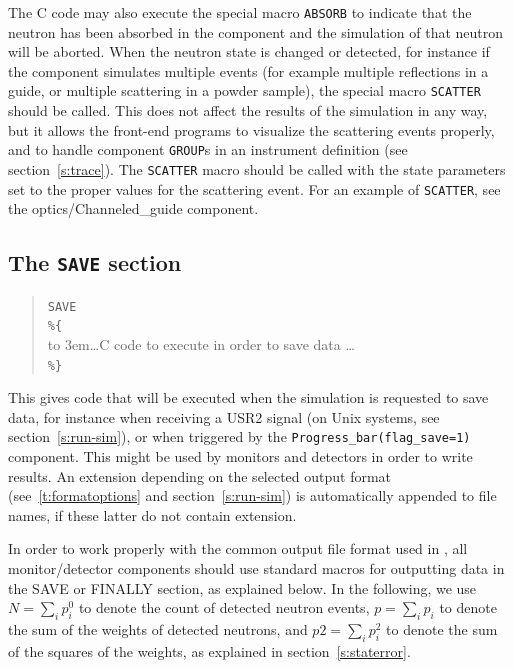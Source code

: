The C code may also execute the special macro \texttt{ABSORB} to indicate
that the neutron has been absorbed in the component and the simulation of
that neutron will be aborted. When the neutron state is changed or detected, for
instance if the component simulates multiple events (for example multiple
reflections in a guide, or multiple scattering in a powder sample), the
special macro \texttt{SCATTER} should be called. This does not affect the
results of the simulation in any way, but it allows the front-end
programs to visualize the scattering events properly, and to handle
component \texttt{GROUP}s in an instrument definition (see
section~\ref{s:trace}). The \texttt{SCATTER} macro should be called with
the state parameters set to the proper values for the scattering event.
For an example of \texttt{SCATTER}, see the optics/Channeled\_guide
component. 


\subsection{The \texttt{SAVE} section}
\label{s:comp-save}

\begin{quote}
  \texttt{SAVE} \\
  \verb|%{| \\
  \hbox to 3em{}\ldots C code to execute in order to save data \ldots \\
  \verb|%}|
\end{quote}
This gives code that will be executed when the simulation is requested to save data, for instance when receiving a USR2 signal (on Unix systems, see section~\ref{s:run-sim}), or when triggered by the \texttt{Progress\_bar(flag\_save=1)} component.
This might be used by monitors and detectors in order to write results.
An extension depending on the selected output format (see~\ref{t:formatoptions} and section~\ref{s:run-sim}) is automatically appended to file names, if these latter do not contain extension.

In order to work properly with the common output file format used in
\MCS, all monitor/detector components should use standard macros for
outputting data in the SAVE or FINALLY section, as explained below. In the
following, we use $N = \sum_i p_i^0$ to denote the count of detected
neutron events, $p = \sum_i p_i$ to denote the sum of the weights of
detected neutrons, and $\textit{p2} = \sum_i p_i^2$ to denote the sum of
the squares of the weights, as explained in section~\ref{s:staterror}.

